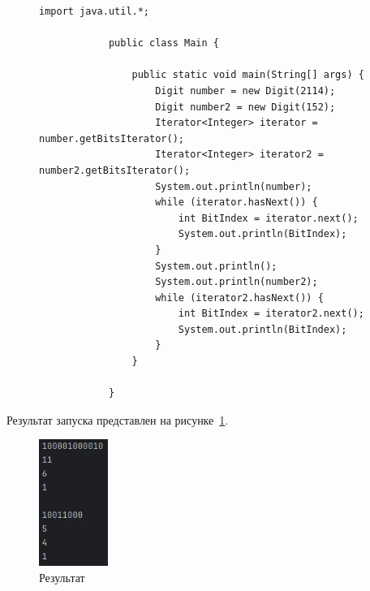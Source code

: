 \documentclass[a4paper, 14pt]{extarticle}
\begin{document}
	\newpage
	
	\begin{figure}[!htb]
		\begin{lstlisting}[language={},caption={Класс Main, в котором реализована проверка работы класса Digit},label={lst:code2}]
			import java.util.*;
			
			public class Main {
				
				public static void main(String[] args) {
					Digit number = new Digit(2114);
					Digit number2 = new Digit(152);
					Iterator<Integer> iterator = number.getBitsIterator();
					Iterator<Integer> iterator2 = number2.getBitsIterator();
					System.out.println(number);
					while (iterator.hasNext()) {
						int BitIndex = iterator.next();
						System.out.println(BitIndex);
					}
					System.out.println();
					System.out.println(number2);
					while (iterator2.hasNext()) {
						int BitIndex = iterator2.next();
						System.out.println(BitIndex);
					}
				}
				
			}
			\end{lstlisting}
		\end{figure}
		
		Результат запуска представлен на рисунке~\ref{fig:img1}.
		
		\begin{figure}[!htb]
			\centering
			\includegraphics[width=0.2\textwidth]{img1}
			\caption{Результат}
			\label{fig:img1}
		\end{figure}
		
	
\end{document}
